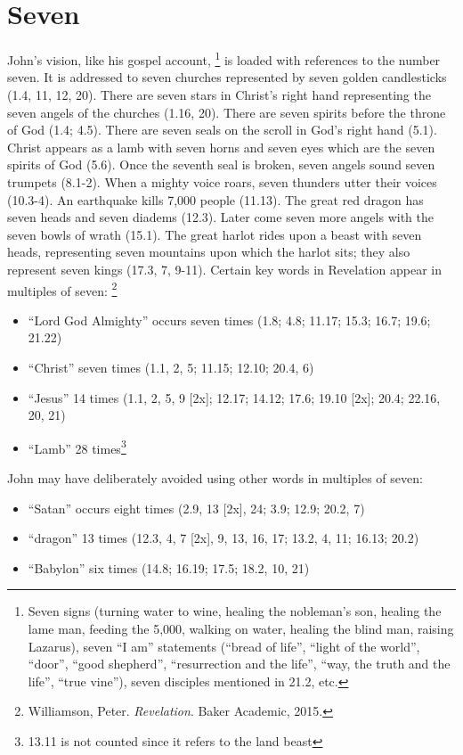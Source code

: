 \section*{Seven}
John's vision, like his gospel account,%
	\footnote{Seven signs (turning water to wine, healing the nobleman's son, healing the lame man, feeding the 5,000, walking on water, healing the blind man, raising Lazarus), seven ``I am'' statements (``bread of life'', ``light of the world'', ``door'', ``good shepherd'', ``resurrection and the life'', ``way, the truth and the life'', ``true vine''), seven disciples mentioned in 21.2, etc.} %
is loaded with references to the number seven. It is addressed to seven churches represented by seven golden candlesticks (1.4, 11, 12, 20). There are seven stars in Christ's right hand representing the seven angels of the churches (1.16, 20). There are seven spirits before the throne of God (1.4; 4.5). There are seven seals on the scroll in God's right hand (5.1). Christ appears as a lamb with seven horns and seven eyes which are the seven spirits of God (5.6). Once the seventh seal is broken, seven angels sound seven trumpets (8.1-2). When a mighty voice roars, seven thunders utter their voices (10.3-4). An earthquake kills 7,000 people (11.13). The great red dragon has seven heads and seven diadems (12.3). Later come seven more angels with the seven bowls of wrath (15.1). The great harlot rides upon a beast with seven heads, representing seven mountains upon which the harlot sits; they also represent seven kings (17.3, 7, 9-11). 
\newline\newline
Certain key words in Revelation appear in multiples of seven:%
	\footnote{Williamson, Peter. \textit{Revelation}. Baker Academic, 2015.} %
\begin{itemize}
 \item ``Lord God Almighty'' occurs seven times (1.8; 4.8; 11.17; 15.3; 16.7; 19.6; 21.22)
 \item ``Christ'' seven times (1.1, 2, 5; 11.15; 12.10; 20.4, 6)
 \item ``Jesus'' 14 times (1.1, 2, 5, 9 [2x]; 12.17; 14.12; 17.6; 19.10 [2x]; 20.4; 22.16, 20, 21)
 \item ``Lamb''  28 times\footnote{13.11 is not counted since it refers to the land beast}
\end{itemize}
John may have deliberately avoided using other words in multiples of seven:
\begin{itemize}
\item ``Satan'' occurs eight times (2.9, 13 [2x], 24; 3.9; 12.9; 20.2, 7)
\item ``dragon'' 13 times (12.3, 4, 7 [2x], 9, 13, 16, 17; 13.2, 4, 11; 16.13; 20.2)
\item ``Babylon'' six times (14.8; 16.19; 17.5; 18.2, 10, 21)
\end{itemize}
